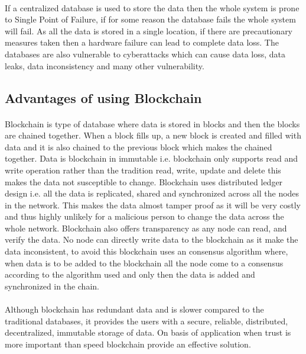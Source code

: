 \documentclass{article}
\begin{document}
        \paragraph{}
        If a centralized database is used to store the data then the whole system is prone to Single Point of Failure, if for some reason the database fails the whole system will fail. As all the data is stored in a single location, if there are precautionary measures taken then a hardware failure can lead to complete data loss. The databases are also vulnerable to cyberattacks which can cause data loss, data leaks, data inconsistency and many other vulnerability.
        
    \subsection{Advantages of using Blockchain}
        \paragraph{}
        Blockchain is type of database where data is stored in blocks and then the blocks are chained together. When a block fills up, a new block is created and filled with data and it is also chained to the previous block which makes the chained together. Data is blockchain in immutable i.e. blockchain only supports read and write operation rather than the tradition read, write, update and delete this makes the data not susceptible to change. Blockchain uses distributed ledger design i.e. all the data is replicated, shared and synchronized across all the nodes in the network. This makes the data almost tamper proof as it will be very costly and thus highly unlikely for a malicious person to change the data across the whole network. Blockchain also offers transparency as any node can read, and verify the data. No node can directly write data to the blockchain as it make the data inconsistent, to avoid this blockchain uses an consensus algorithm where, when data is to be added to the blockchain all the node come to a consensus according to the algorithm used and only then the data is added and synchronized in the chain.
        \paragraph{}
        Although blockchain has redundant data and is slower compared to the traditional databases, it provides the users with a secure, reliable, distributed, decentralized, immutable storage of data. On basis of application when trust is more important than speed blockchain provide an effective solution.
        
\end{document}
